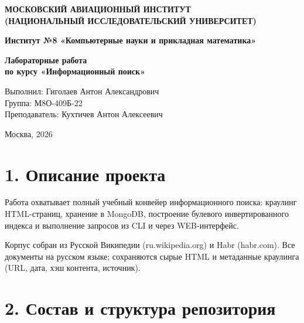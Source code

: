 ﻿\documentclass[12pt,a4paper]{article}
\begin{document}
\thispagestyle{empty}

\begin{center}
\textbf{МОСКОВСКИЙ АВИАЦИОННЫЙ ИНСТИТУТ}\\
\textbf{(НАЦИОНАЛЬНЫЙ ИССЛЕДОВАТЕЛЬСКИЙ УНИВЕРСИТЕТ)}
\end{center}

\vspace{2.2cm}

\begin{center}
\textbf{Институт №8 «Компьютерные науки и прикладная математика»}
\end{center}

\vspace{3.0cm}

\begin{center}
{\Large \textbf{Лабораторные работа}}\\[0.4cm]
{\Large \textbf{по курсу «Информационный поиск»}}
\end{center}

\vspace{4.0cm}

\begin{flushleft}
Выполнил: Гиголаев Антон Александрович\\
Группа: М8О-409Б-22\\
Преподаватель: Кухтичев Антон Алексеевич
\end{flushleft}

\vfill

\begin{center}
Москва, 2026
\end{center}

\newpage

\section*{1. Описание проекта}

Работа охватывает полный учебный конвейер информационного поиска: краулинг HTML-страниц, хранение в MongoDB, построение булевого инвертированного индекса и выполнение запросов из CLI и через WEB-интерфейс.

Корпус собран из Русской Википедии (ru.wikipedia.org) и Habr (habr.com). Все документы на русском языке; сохраняются сырые HTML и метаданные краулинга (URL, дата, хэш контента, источник).

\section*{2. Состав и структура репозитория}
\end{document}
